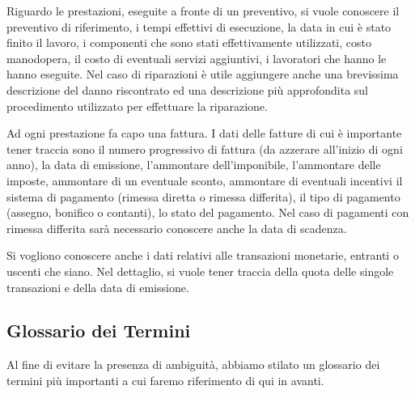 		Riguardo le prestazioni, eseguite a fronte di un preventivo, si vuole conoscere il preventivo di riferimento, i tempi effettivi di esecuzione, la data in cui è stato finito il lavoro, i componenti che sono stati effettivamente utilizzati, costo manodopera, il costo di eventuali servizi aggiuntivi, i lavoratori che hanno le hanno eseguite.
		Nel caso di riparazioni è utile aggiungere anche una brevissima descrizione del danno riscontrato ed una descrizione più approfondita sul procedimento utilizzato per effettuare la riparazione.
		
		Ad ogni prestazione fa capo una fattura. I dati delle fatture di cui è importante tener traccia sono il numero progressivo di fattura (da azzerare all'inizio di ogni anno), la data di emissione, l'ammontare dell'imponibile, l'ammontare delle imposte, ammontare di un eventuale sconto, ammontare di eventuali incentivi il sistema di pagamento (rimessa diretta o rimessa differita), il tipo di pagamento (assegno, bonifico o contanti), lo stato del pagamento. Nel caso di pagamenti con rimessa differita sarà necessario conoscere anche la data di scadenza.
		
		Si vogliono conoscere anche i dati relativi alle transazioni monetarie, entranti o uscenti che siano. Nel dettaglio, si vuole tener traccia della quota delle singole transazioni e della data di emissione.
		
	\subsection{Glossario dei Termini}
	
		Al fine di evitare la presenza di ambiguità, abbiamo stilato un glossario dei termini più importanti a cui faremo riferimento di qui in avanti.
						
